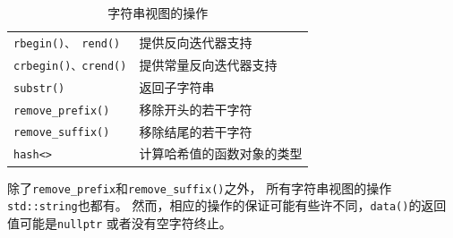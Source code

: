 \begin{table}[htb]
\begin{tabular}{l|l}
        \texttt{rbegin()、 rend()}          & 提供反向迭代器支持                          \\
        \texttt{crbegin()、crend()}         & 提供常量反向迭代器支持                        \\
        \texttt{substr()}                  & 返回子字符串                             \\
        \texttt{remove\_prefix()}          & 移除开头的若干字符                          \\
        \texttt{remove\_suffix()}          & 移除结尾的若干字符                          \\
        \texttt{hash<>}                    & 计算哈希值的函数对象的类型                      \\
        \hline
    \end{tabular}
    \caption{字符串视图的操作}
    \label{t19.1}
\end{table}

除了\texttt{remove\_prefix}和\texttt{remove\_suffix()}之外，
所有字符串视图的操作\texttt{std::string}也都有。
然而，相应的操作的保证可能有些许不同，\texttt{data()}的返回值可能是\texttt{nullptr}
或者没有空字符终止。

